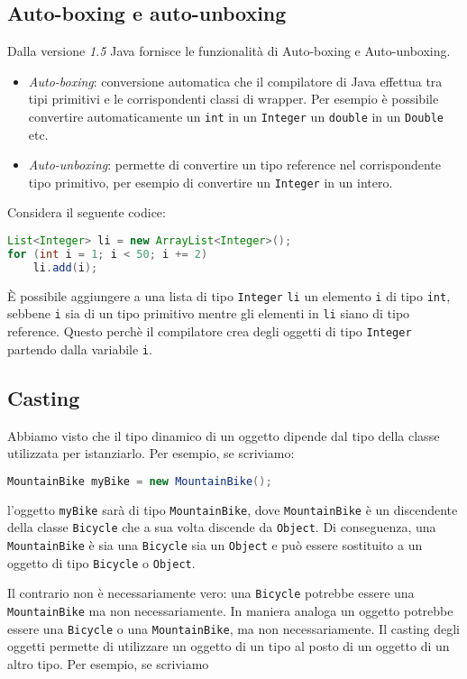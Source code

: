 \documentclass{article}
\begin{document}
\subsection{Auto-boxing e auto-unboxing}
Dalla versione \emph{1.5} Java fornisce le funzionalit\`a di Auto-boxing e Auto-unboxing.
\begin{itemize}
\item \emph{Auto-boxing}: conversione automatica che il compilatore di Java effettua tra tipi primitivi e le corrispondenti classi di wrapper.
Per esempio \`e possibile convertire automaticamente un \texttt{int} in un \texttt{Integer} un \texttt{double} in un \texttt{Double} etc.\\
\item \emph{Auto-unboxing}: permette di convertire un tipo reference nel corrispondente tipo primitivo, per esempio di convertire un \texttt{Integer} in un intero.
\end{itemize}
Considera il seguente codice:
\begin{lstlisting}[language=Java,escapechar=|]
List<Integer> li = new ArrayList<Integer>();
for (int i = 1; i < 50; i += 2)
    li.add(i);
\end{lstlisting}
\`E possibile aggiungere a una lista di tipo \texttt{Integer} \texttt{li} un elemento \texttt{i} di tipo \texttt{int}, sebbene \texttt{i} sia di un tipo primitivo mentre gli elementi in \texttt{li} siano di tipo reference. Questo perch\`e il compilatore crea degli oggetti di tipo \texttt{Integer} partendo dalla variabile \texttt{i}.

\subsection{Casting}
Abbiamo visto che il tipo dinamico di un oggetto dipende dal tipo della classe utilizzata per istanziarlo. Per esempio, se scriviamo:
\begin{lstlisting}[language=Java,escapechar=|]
MountainBike myBike = new MountainBike();
\end{lstlisting}
l'oggetto \texttt{myBike} sar\`a di tipo \texttt{MountainBike}, dove  \texttt{MountainBike} \`e un discendente della classe \texttt{Bicycle} che a sua volta discende da \texttt{Object}. Di conseguenza, una \texttt{MountainBike} \`e sia una \texttt{Bicycle} sia un \texttt{Object} e pu\`o essere sostituito a un oggetto di tipo \texttt{Bicycle} o \texttt{Object}.

Il contrario non \`e necessariamente vero: una \texttt{Bicycle} potrebbe essere una \texttt{MountainBike} ma non necessariamente. In maniera analoga un oggetto potrebbe essere una \texttt{Bicycle} o una \texttt{MountainBike}, ma non necessariamente. Il casting degli oggetti permette di utilizzare un oggetto di un tipo al posto di un oggetto di un altro tipo. Per esempio, se scriviamo 
\end{document}
